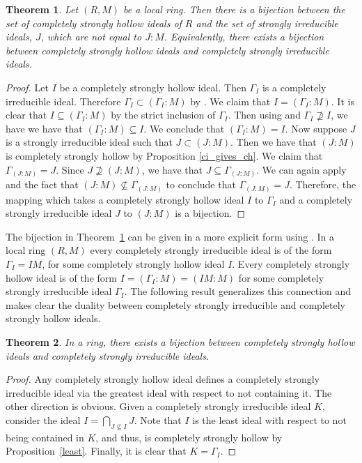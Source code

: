 \documentclass[11pt,english]{amsart}
\newtheorem{theorem}{Theorem}[section]
\theoremstyle{definition}
\numberwithin{equation}{section}
\theoremstyle{remark}
\begin{document}
\begin{theorem}\label{bijection}
    Let $(R,M)$ be a local ring. Then there is a bijection between the set of completely strongly hollow ideals of $R$ and the set of strongly irreducible ideals, $J$, which are not equal to $J:M$. Equivalently, there exists a bijection between completely strongly hollow ideals and completely strongly irreducible ideals. 
\end{theorem}
\begin{proof}
    Let $I$ be a completely strongly hollow ideal. Then $\Gamma_I$ is a completely irreducible ideal. Therefore $\Gamma_I\subset(\Gamma_I:M)$ by \cite[Theorem.~1.3(iv)]{FHO}. We claim that $I=(\Gamma_I:M)$. It is clear that $I\subseteq(\Gamma_I:M)$ by the strict inclusion of $\Gamma_I$. Then using \cite[Theorem.~2.6(3)]{HRR2002} and $\Gamma_I\not\supseteq I$, we have we have that $(\Gamma_I:M)\subseteq  I$. We conclude that $(\Gamma_I:M)=I$. Now suppose $J$ is a strongly irreducible ideal such that $J\subset (J:M)$. Then we have that $(J:M)$ is completely strongly hollow by Proposition \ref{ci_gives_ch}. We claim that $\Gamma_{(J:M)}=J$. Since $J\not\supseteq (J:M)$, we have that $J\subseteq \Gamma_{(J:M)}$. We can again apply \cite[Theorem.~2.6(3)]{HRR2002} and the fact that $(J:M)\not\subseteq \Gamma_{(J:M)}$ to conclude that $\Gamma_{(J:M)}=J$. Therefore, the mapping which takes a completely strongly hollow ideal $I$ to $\Gamma_I$ and a completely strongly irreducible ideal $J$ to $(J:M)$ is a bijection.
\end{proof}
The bijection in Theorem~\ref{bijection} can be given in a more explicit form using \cite[Theorem.~2.6(2)]{HRR2002}. In a local ring $(R,M)$ every completely strongly irreducible ideal is of the form $\Gamma_I=IM$, for some completely strongly hollow ideal $I$. Every completely strongly hollow ideal is of the form $I=(\Gamma_I:M)=(IM:M)$ for some completely strongly irreducible ideal $\Gamma_I$.
The following result generalizes this connection and makes clear the duality between completely strongly irreducible and completely strongly hollow ideals.
\begin{theorem}\label{true_bij}
    In a ring, there exists a bijection between completely strongly hollow ideals and completely strongly irreducible ideals.
\end{theorem}

\begin{proof}
    Any completely strongly hollow ideal defines a completely strongly irreducible ideal via the greatest ideal with respect to not containing it. The other direction is  obvious. Given a completely strongly irreducible ideal $K$, consider the ideal $I=\bigcap_{J\not\subseteq I}J$. Note that $I$ is the least ideal with respect to not being contained in $K$, and thus, is completely strongly hollow by Proposition~\ref{least}. Finally, it is clear that $K=\Gamma_I$. 
\end{proof}
\end{document}
